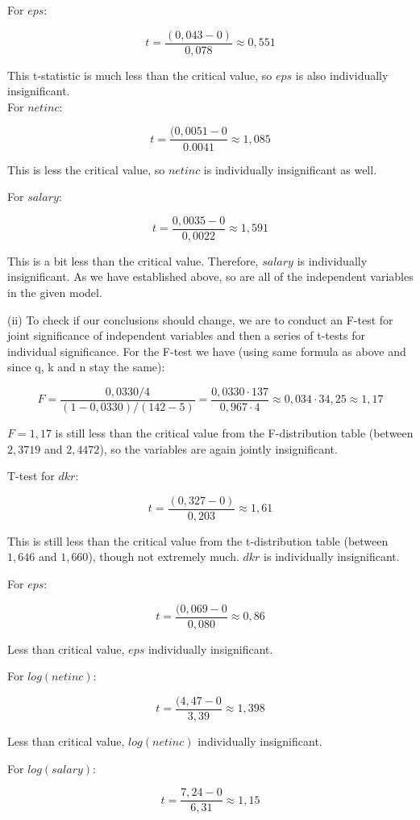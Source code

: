 \documentclass{article}
\begin{document}
For $eps$:

$$t = \frac{(0,043 - 0)}{0,078} \approx 0,551$$

This t-statistic is much less than the critical value, so $eps$ is also individually insignificant.
\\

For $netinc$:

$$t = \frac{(0,0051 - 0}{0.0041} \approx 1,085$$

This is less the critical value, so $netinc$ is individually insignificant as well.

For $salary$:

$$t = \frac{0,0035 - 0}{0,0022} \approx 1,591$$

This is a bit less than the critical value. Therefore, $salary$ is individually insignificant. As we have established above, so are all of the independent variables in the given model.

(ii) To check if our conclusions should change, we are to conduct an F-test for joint significance of independent variables and then a series of t-tests for individual significance. For the F-test we have (using same formula as above and since q, k and n stay the same):

$$F = \frac{0,0330 / 4}{(1 - 0,0330) / (142 - 5)} = \frac{0,0330 \cdot 137}{0,967 \cdot 4} \approx 0,034 \cdot 34,25 \approx 1,17$$

$F = 1,17$ is still less than the critical value from the F-distribution table (between $2,3719$ and $2,4472$), so the variables are again jointly insignificant.

T-test for $dkr$:

$$t = \frac{(0,327 - 0)}{0,203} \approx 1,61$$

This is still less than the critical value from the t-distribution table (between $1,646$ and $1,660$), though not extremely much. $dkr$ is individually insignificant.

For $eps$:

$$t = \frac{(0,069 - 0}{0,080} \approx 0,86$$

Less than critical value, $eps$ individually insignificant.

For $log(netinc)$:

$$t = \frac{(4,47 - 0}{3,39} \approx 1,398$$

Less than critical value, $log(netinc)$ individually insignificant.

For $log(salary)$:

$$t = \frac{7,24 - 0}{6,31} \approx 1,15$$
\end{document}

